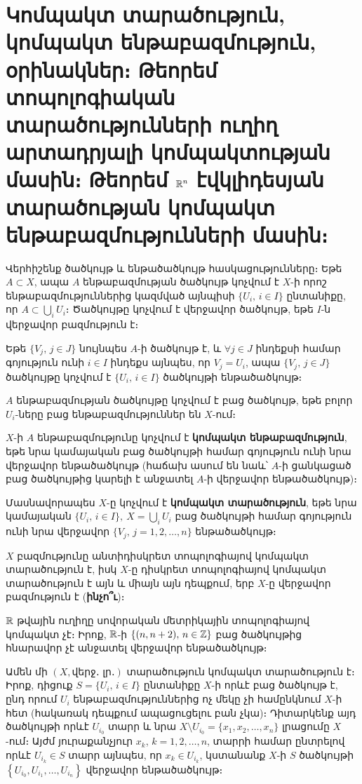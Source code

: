 \documentclass[./main.tex]{subfiles}
\begin{document}
\onehalfspacing
\section{Կոմպակտ տարածություն, կոմպակտ ենթաբազմություն, օրինակներ։ Թեորեմ տոպոլոգիական տարածությունների ուղիղ արտադրյալի կոմպակտության մասին։ Թեորեմ $\mathbb{R}^n$ էվկլիդեսյան տարածության կոմպակտ ենթաբազմությունների մասին։}\label{sec:17}

Վերհիշենք ծածկույթ և ենթածածկույթ հասկացությունները։ Եթե $A\subset X$, ապա $A$ ենթաբազմության ծածկույթ կոչվում է $X$-ի որոշ ենթաբազմություններից կազմ\-ված այնպիսի $\{ U_i,\, i\in I\} $ ընտանիքը, որ $A\subset \bigcup\limits_i U_i$։ Ծածկույթը կոչվում է վերջավոր ծածկույթ, եթե $I$-ն վերջավոր բազմություն է։
\par Եթե $\{V_j,\, j\in J\}$ նույնպես $A$-ի ծածկույթ է, և $\forall j\in J$ ինդեքսի համար գոյություն ունի $i\in I$ ինդեքս այնպես, որ $V_j=U_i$, ապա $\{V_j,\, j\in J\}$ ծածկույթը կոչվում է $\{U_i,\, i\in I\}$ ծածկույթի ենթածածկույթ։
\par $A$ ենթաբազմության ծածկույթը կոչվում է բաց ծածկույթ, եթե բոլոր $U_i$-ները բաց ենթաբազմություններ են $X$-ում։
\begin{definition} $X$-ի $A$ ենթաբազմությունը կոչվում է \textbf{կոմպակտ ենթաբազմություն}, եթե նրա կամայական բաց ծածկույթի համար գոյություն ունի նրա վերջավոր են\-թա\-ծած\-կույթ (հաճախ ասում են նաև՝ $A$-ի ցանկացած բաց ծածկույթից կարելի է ան\-ջա\-տել $A$-ի վերջավոր ենթածածկույթ)։
\end{definition}
\par Մասնավորապես $X$-ը կոչվում է \textbf{կոմպակտ տարածություն}, եթե նրա կա\-մա\-յա\-կան $\{U_i,\, i\in I\},\ X=\bigcup\limits_i U_i$ բաց ծածկույթի համար գոյություն ունի նրա վերջավոր $\{V_j,\, j=1,2,\dots,n\}$ ենթածածկույթ։
\begin{example}\label{ch17ex1}
$X$ բազմությունը անտիդիսկրետ տոպոլոգիայով կոմպակտ տարա\-ծություն է, իսկ $X$-ը դիսկրետ տոպոլոգիայով կոմպակտ տարածություն է այն և միայն այն դեպքում, երբ $X$-ը վերջավոր բազմություն է (\textbf{ինչո՞ւ})։
\end{example}
\begin{example}\label{ch17ex2}
$\mathbb{R}$ թվային ուղիղը սովորական մետրիկային տոպոլոգիայով կոմ\-պակտ չէ։ Իրոք, $\mathbb{R}$-ի $\{(n,n+2),\, n\in \mathbb{Z}\}$ բաց ծածկույթից հնարավոր չէ անջատել վեր\-ջա\-վոր ենթածածկույթ։
\end{example}

\begin{example}\label{ch17ex3}
Ամեն մի $(X, \text{վերջ․ լր․})$ տարածություն կոմպակտ տարածություն է։ Իրոք, դիցուք $S = \{U_i,\,  i \in I\}$ ընտանիքը $X$-ի որևէ բաց ծածկույթ է, ընդ որում $U_i$ ենթաբազմություններից ոչ մեկը չի համընկնում $X$-ի հետ (հակառակ դեպքում ապա\-ցուցելու բան չկա)։ Դիտարկենք այդ ծածկույթի որևէ $U_{i_0}$ տարր և նրա ${X \setminus U_{i_0}} = \{x_1, x_2, \dots, x_n\}$ լրացումը $X$-ում։ Այժմ յուրաքանչյուր $x_k$, $k=1, 2, \dots, n$, տարրի համար ընտրելով որևէ $U_{i_k} \in S$ տարր այնպես, որ $x_k \in U_{i_k}$, կստանանք $X$-ի $S$ ծած\-կույ\-թի $\left\{U_{i_0}, U_{i_1}, \dots, U_{i_n}\right\}$ վերջավոր ենթածածկույթ։
\end{example}
\end{document}
